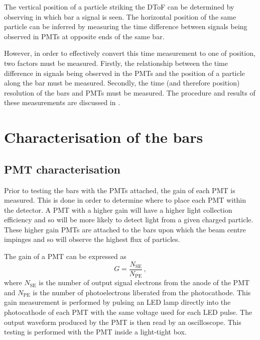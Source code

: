 The vertical position of a particle striking the DToF can be determined by observing in which bar a signal is seen.
The horizontal position of the same particle can be inferred by measuring the time difference between signals being observed in PMTs at opposite ends of the same bar.

However, in order to effectively convert this time measurement to one of position, two factors must be measured.
Firstly, the relationship between the time difference in signals being observed in the PMTs and the position of a particle along the bar must be measured.
Secondly, the time (and therefore position) resolution of the bars and PMTs must be measured.
The procedure and results of these measurements are discussed in .

\section{Characterisation of the bars}
\label{sec:hptpc_dtof_characterisation:characterisation}

\subsection{PMT characterisation}
\label{sec:hptpc_dtof_characterisation:characterisation:pmt}

Prior to testing the bars with the PMTs attached, the gain of each PMT is measured.
This is done in order to determine where to place each PMT within the detector.
A PMT with a higher gain will have a higher light collection efficiency and so will be more likely to detect light from a given charged particle.
These higher gain PMTs are attached to the bars upon which the beam centre impinges and so will observe the highest flux of particles.

The gain of a PMT can be expressed as
\begin{equation}
  G = \frac{N_{\text{SE}}}{N_{\text{PE}}} \, ,
  \label{eq:gainEq}
\end{equation}
where $N_{\text{SE}}$ is the number of output signal electrons from the anode of the PMT and $N_{\text{PE}}$ is the number of photoelectrons liberated from the photocathode.
This gain measurement is performed by pulsing an LED lamp directly into the photocathode of each PMT with the same voltage used for each LED pulse.
The output waveform produced by the PMT is then read by an oscilloscope.
This testing is performed with the PMT inside a light-tight box.

